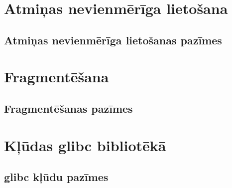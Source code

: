 \section{Atmiņas nevienmērīga lietošana}
\subsection{Atmiņas nevienmērīga lietošanas pazīmes}

\section{Fragmentēšana}
\subsection{Fragmentēšanas pazīmes}

\section{Kļūdas glibc bibliotēkā}
\subsection{glibc kļūdu pazīmes}
